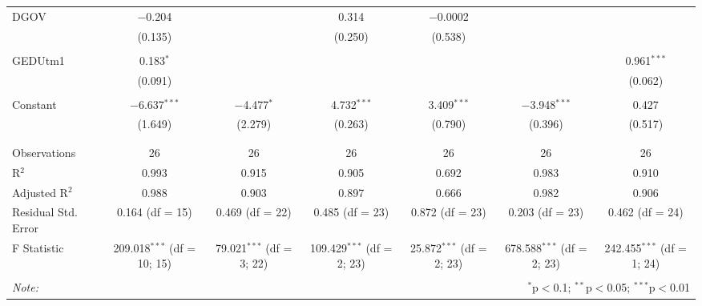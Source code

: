 \documentclass[8pt]{extarticle}
\begin{document}
\begin{landscape}
\begin{table}[!htbp]
\begin{tabular}{@{\extracolsep{5pt}}lcccccc}
 DGOV & $-$0.204 &  & 0.314 & $-$0.0002 &  &  \\ 
  & (0.135) &  & (0.250) & (0.538) &  &  \\ 
  & & & & & & \\ 
 GEDUtm1 & 0.183$^{*}$ &  &  &  &  & 0.961$^{***}$ \\ 
  & (0.091) &  &  &  &  & (0.062) \\ 
  & & & & & & \\ 
 Constant & $-$6.637$^{***}$ & $-$4.477$^{*}$ & 4.732$^{***}$ & 3.409$^{***}$ & $-$3.948$^{***}$ & 0.427 \\ 
  & (1.649) & (2.279) & (0.263) & (0.790) & (0.396) & (0.517) \\ 
  & & & & & & \\ 
\hline \\[-1.8ex] 
Observations & 26 & 26 & 26 & 26 & 26 & 26 \\ 
R$^{2}$ & 0.993 & 0.915 & 0.905 & 0.692 & 0.983 & 0.910 \\ 
Adjusted R$^{2}$ & 0.988 & 0.903 & 0.897 & 0.666 & 0.982 & 0.906 \\ 
Residual Std. Error & 0.164 (df = 15) & 0.469 (df = 22) & 0.485 (df = 23) & 0.872 (df = 23) & 0.203 (df = 23) & 0.462 (df = 24) \\ 
F Statistic & 209.018$^{***}$ (df = 10; 15) & 79.021$^{***}$ (df = 3; 22) & 109.429$^{***}$ (df = 2; 23) & 25.872$^{***}$ (df = 2; 23) & 678.588$^{***}$ (df = 2; 23) & 242.455$^{***}$ (df = 1; 24) \\ 
\hline 
\hline \\[-1.8ex] 
\textit{Note:}  & \multicolumn{6}{r}{$^{*}$p$<$0.1; $^{**}$p$<$0.05; $^{***}$p$<$0.01} \\ 
\end{tabular} 
\end{table} 



\end{landscape}



\cleardoublepage
%








\end{document}
